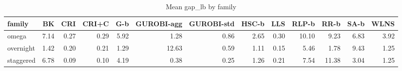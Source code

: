 \begin{table}[htbp]
\centering
\small
\caption{Mean gap\_lb by family}
\label{tab:E4a_equal_budgets_b10_by_family}
\begin{tabular}{lrrrrrrrrrrrr}
\toprule
family & BK & CRI & CRI+C & G-b & GUROBI-agg & GUROBI-std & HSC-b & LLS & RLP-b & RR-b & SA-b & WLNS \\
\midrule
omega & 7.14 & 0.27 & 0.29 & 5.92 & 1.28 & 0.86 & 2.65 & 0.30 & 10.10 & 9.23 & 6.83 & 3.92 \\
overnight & 1.42 & 0.20 & 0.21 & 1.29 & 12.63 & 0.59 & 1.11 & 0.15 & 5.46 & 1.78 & 9.43 & 1.25 \\
staggered & 6.78 & 0.09 & 0.10 & 4.19 & 0.38 & 0.25 & 1.26 & 0.21 & 7.54 & 11.38 & 3.04 & 1.25 \\
\bottomrule
\end{tabular}
\end{table}
